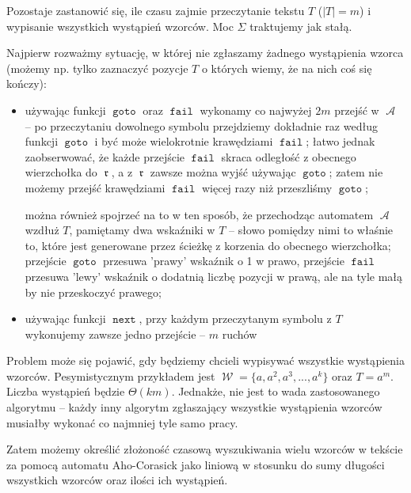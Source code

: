 \documentclass{article}
\DeclareMathOperator{\rot}{\mathfrak{r}}
\DeclareMathOperator{\W}{\mathcal{W}}
\DeclareMathOperator{\A}{\mathcal{A}}
\DeclareMathOperator{\goto}{\texttt{goto}}
\DeclareMathOperator{\next}{\texttt{next}}
\DeclareMathOperator{\fail}{\texttt{fail}}
\begin{document}
Pozostaje zastanowić się, ile czasu zajmie przeczytanie tekstu $T$ ($|T|=m$) i wypisanie wszystkich wystąpień wzorców. Moc $\Sigma$ traktujemy jak stałą.

Najpierw rozważmy sytuację, w której nie zgłaszamy żadnego wystąpienia wzorca (możemy np. tylko zaznaczyć pozycje $T$ o których wiemy, że na nich coś się kończy):
\begin{itemize}
    \item używając funkcji $\goto$ oraz $\fail$ wykonamy co najwyżej $2m$ przejść w $\A$ -- po przeczytaniu dowolnego symbolu przejdziemy dokładnie raz według funkcji $\goto$ i być może wielokrotnie krawędziami $\fail$; łatwo jednak zaobserwować, że każde przejście $\fail$ skraca odległość z obecnego wierzchołka do $\rot$, a z $\rot$ zawsze można wyjść używając $\goto$; zatem nie możemy przejść krawędziami $\fail$ więcej razy niż przeszliśmy $\goto$;

    można również spojrzeć na to w ten sposób, że przechodząc automatem $\A$ wzdłuż $T$, pamiętamy dwa wskaźniki w $T$ -- słowo pomiędzy nimi to właśnie to, które jest generowane przez ścieżkę z korzenia do obecnego wierzchołka; przejście $\goto$ przesuwa 'prawy' wskaźnik o 1 w prawo, przejście $\fail$ przesuwa 'lewy' wskaźnik o dodatnią liczbę pozycji w prawą, ale na tyle małą by nie przeskoczyć prawego;

    \item używając funkcji $\next$, przy każdym przeczytanym symbolu z $T$ wykonujemy zawsze jedno przejście -- $m$ ruchów
\end{itemize}

Problem może się pojawić, gdy będziemy chcieli wypisywać wszystkie wystąpienia wzorców. Pesymistycznym przykładem jest $\W=\{a,a^2,a^3,...,a^k\}$ oraz $T=a^m$. Liczba wystąpień będzie $\Theta(km)$. Jednakże, nie jest to wada zastosowanego algorytmu -- każdy inny algorytm zgłaszający wszystkie wystąpienia wzorców musiałby wykonać co najmniej tyle samo pracy.

Zatem możemy określić złożoność czasową wyszukiwania wielu wzorców w tekście za pomocą automatu Aho-Corasick jako liniową w stosunku do sumy długości wszystkich wzorców oraz ilości ich wystąpień.
\end{document}
